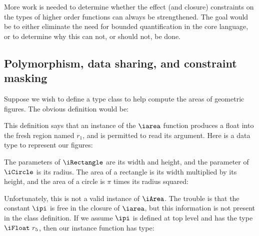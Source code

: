 More work is needed to determine whether the effect (and closure) constraints on the types of higher order functions can always be strengthened. The goal would be to either eliminate the need for bounded quantification in the core language, or to determine why this can not, or should not, be done.


\subsection{Polymorphism, data sharing, and constraint masking}
\label{Evaluation:Limits:sharing-and-constraint-masking}

Suppose we wish to define a type class to help compute the areas of geometric figures. The obvious definition would be:


This definition says that an instance of the $\iarea$ function produces a float into the fresh region named $r_1$, and is permitted to read its argument. Here is a data type to represent our figures:


The parameters of $\iRectangle$ are its width and height, and the parameter of $\iCircle$ is its radius. The area of a rectangle is its width multiplied by its height, and the area of a circle is $\pi$ times its radius squared:


Unfortunately, this is not a valid instance of $\iArea$. The trouble is that the constant $\ipi$ is free in the closure of $\iarea$, but this information is not present in the class definition. If we assume $\ipi$ is defined at top level and has the type $\iFloat \ r_5$, then our instance function has type:

